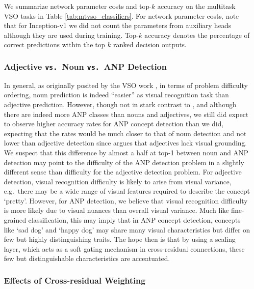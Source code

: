 \documentclass{sig-alternate-05-2015}
\begin{document}
We summarize network parameter costs and top-$k$ accuracy on the multitask VSO tasks in Table \ref{tab:mtvso_classifiers}.
For network parameter costs, note that for Inception-v1 \cite{szegedy_2015} we did not count the parameters from auxiliary heads although they are used during training.
Top-$k$ accuracy denotes the percentage of correct predictions within the top $k$ ranked decision outputs.

\subsubsection{Adjective \texttt{vs.}~Noun \texttt{vs.}~ANP Detection}

In general, as originally posited by the VSO work \cite{borth_2013}, in terms of problem difficulty ordering, noun prediction is indeed ``easier'' as visual recognition task than adjective prediction.
However, though not in stark contrast to \cite{borth_2013}, and although there are indeed more ANP classes than nouns and adjectives, we still did expect to observe higher accuracy rates for ANP concept detection than we did, expecting that the rates would be much closer to that of noun detection and not lower than adjective detection since \cite{borth_2013} argues that adjectives lack visual grounding.
We suspect that this difference by almost a half at top-1 between noun and ANP detection may point to the difficulty of the ANP detection problem in a slightly different sense than difficulty for the adjective detection problem.
For adjective detection, visual recognition difficulty is likely to arise from visual variance, e.g.~there may be a wide range of visual features required to describe the concept `pretty'.
However, for ANP detection, we believe that visual recognition difficulty is more likely due to visual nuances than overall visual variance.
Much like fine-grained classification, this may imply that in ANP concept detection, concepts like `sad dog' and `happy dog' may share many visual characteristics but differ on few but highly distinguishing traits.
The hope then is that by using a scaling layer, which acts as a soft gating mechanism in cross-residual connections, these few but distinguishable characteristics are accentuated.

\subsubsection{Effects of Cross-residual Weighting}
\end{document}
